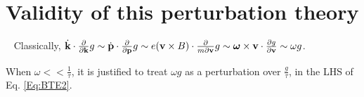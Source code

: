 \documentclass[aps,pra,amsmath,amssymb,floatfix,twocolumn, amsmath, superscriptaddress, twocolumn]{revtex4-2}
\newcommand{\bvec}[1]{{\mathbf #1}}
\renewcommand\vec[1]{\ensuremath\boldsymbol{#1}} %
\begin{document}
\appendix
\section{Validity of this perturbation theory}~\label{app:perturbation_validation}
Classically, $\dot{\bvec{k}}\cdot\frac{\partial}{\partial \bvec{k}} g \sim \dot{\bvec{p}}\cdot\frac{\partial}{\partial \bvec{p}} g \sim e (\bvec{v}\times{B})\cdot\frac{\partial}{m\partial \bvec{v}} g \sim \vec{\omega} \times \bvec{v}\cdot \frac{\partial g}{\partial \bvec{v}} \sim \omega g$.

When $\omega << \frac{1}{\tau}$, it is justified to treat $\omega g$ as a perturbation over $\frac{g}{\tau}$, in the LHS of Eq. \eqref{Eq:BTE2}.


\begin{thebibliography}{}



\end{thebibliography}
\end{document}
